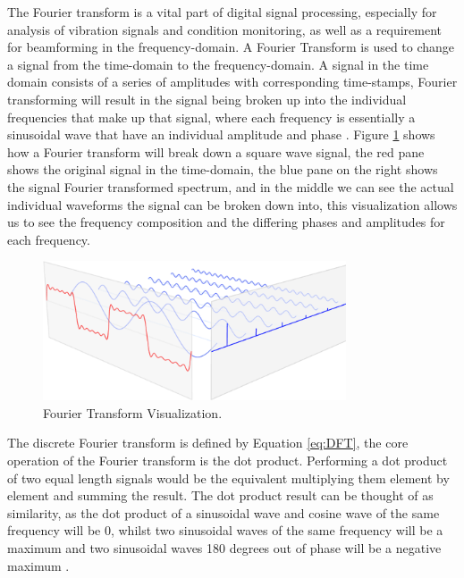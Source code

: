 \documentclass{UoNMCHA}
\numberwithin{equation}{section}
\begin{document}
    The Fourier transform is a vital part of digital signal processing, especially for analysis of vibration signals and condition monitoring, as well as a requirement for beamforming in the frequency-domain. A Fourier Transform is used to change a signal from the time-domain to the frequency-domain. A signal in the time domain consists of a series of amplitudes with corresponding time-stamps, Fourier transforming will result in the signal being broken up into the individual frequencies that make up that signal, where each frequency is essentially a sinusoidal wave that have an individual amplitude and phase \citep{Sch17}. Figure \ref{fig:Fourier Transform} shows how a Fourier transform will break down a square wave signal, the red pane shows the original signal in the time-domain, the blue pane on the right shows the signal Fourier transformed spectrum, and in the middle we can see the actual individual waveforms the signal can be broken down into, this visualization allows us to see the frequency composition and the differing phases and amplitudes for each frequency.
    
    \begin{figure}[H]
        \centering
        \includegraphics[keepaspectratio, width = 0.8\textwidth]{Figures/FFT.png}
        \caption{Fourier Transform Visualization.}
        \label{fig:Fourier Transform}
    \end{figure}
    
    The discrete Fourier transform is defined by Equation \ref{eq:DFT}, the core operation of the Fourier transform is the dot product. Performing a dot product of two equal length signals would be the equivalent multiplying them element by element and summing the result. The dot product result can be thought of as similarity, as the dot product of a sinusoidal wave and cosine wave of the same frequency will be 0, whilst two sinusoidal waves of the same frequency will be a maximum and two sinusoidal waves 180 degrees out of phase will be a negative maximum \citep{Sch17}. 
    
\end{document}
